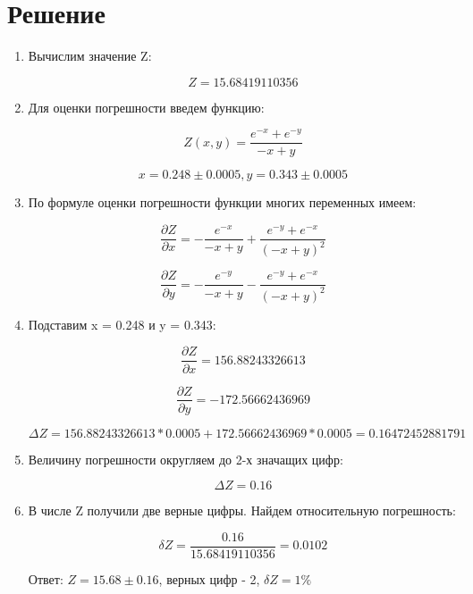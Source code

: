 \documentclass[a4paper,12pt]{article} %
\begin{document}
\section{Решение}

\begin{enumerate}

\item Вычислим значение Z:

 $$Z = 15.68419110356$$

\item Для оценки погрешности введем функцию:

$$Z(x, y) = \frac{e^{-x} + e^{-y}}{-x + y}$$

$$x = 0.248 \pm 0.0005, y = 0.343 \pm 0.0005$$

\item По формуле оценки погрешности функции многих переменных имеем:

$$\frac{\partial Z}{\partial x} = - \frac{e^{- x}}{- x + y} + \frac{e^{- y} + e^{- x}}{(- x + y)^{2}}$$

$$\frac{\partial Z}{\partial y} = - \frac{e^{- y}}{- x + y} - \frac{e^{- y} + e^{- x}}{(- x + y)^{2}}$$


\newpage

\item Подставим x = 0.248 и y = 0.343:

$$\frac{\partial Z}{\partial x} = 156.88243326613$$

$$\frac{\partial Z}{\partial y} = -172.56662436969$$

$$\Delta Z = 156.88243326613 * 0.0005 + 172.56662436969 * 0.0005 = 0.16472452881791$$

\item Величину погрешности округляем до 2-х значащих цифр: 

$$\Delta Z = 0.16$$

\item В числе Z получили две верные цифры. Найдем относительную погрешность:

$$\delta Z = \frac{0.16}{15.68419110356} = 0.0102$$


\vspace{3cm}
\Large Ответ: $Z = 15.68 \pm 0.16$, верных цифр - 2, $\delta Z = 1\%$




\end{enumerate}
\end{document}
